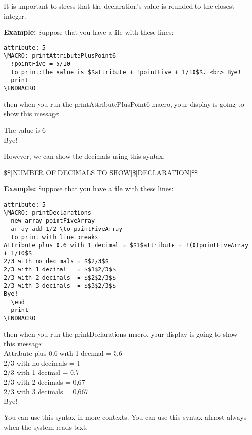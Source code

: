 \documentclass[11pt,a4paper,openright,oneside]{book}
\newenvironment{ex}
{
  \setlength{\parindent}{0cm}
  \large \textbf{Example:} \normalsize 
}
{}
\begin{document}
It is important to stress that the declaration's value is rounded to the closest integer.

\begin{ex} Suppose that you have a file with these lines:
  \begin{lstlisting}
attribute: 5
\MACRO: printAttributePlusPoint6
  !pointFive = 5/10
  to print:The value is $$attribute + !pointFive + 1/10$$. <br> Bye!
  print
\ENDMACRO
  \end{lstlisting} 
then when you run the \textsf{printAttributePlusPoint6} macro, your display is going to show this message:
\vspace{5px}

\textsf{The value is 6 \\
Bye! \\}
\end{ex}

However, we can show the decimals using this syntax:
\begin{center} \textsf{\$\$\textsc{\scriptsize[NUMBER OF DECIMALS TO SHOW]}\$\textsc{\scriptsize[DECLARATION]}\$\$} \end{center}

\begin{ex} Suppose that you have a file with these lines:
\scriptsize
  \begin{lstlisting}
attribute: 5
\MACRO: printDeclarations
  new array pointFiveArray
  array-add 1/2 \to pointFiveArray
  to print with line breaks
Attribute plus 0.6 with 1 decimal = $$1$attribute + !(0)pointFiveArray + 1/10$$
2/3 with no decimals = $$2/3$$
2/3 with 1 decimal   = $$1$2/3$$
2/3 with 2 decimals  = $$2$2/3$$
2/3 with 3 decimals  = $$3$2/3$$
Bye!
  \end
  print
\ENDMACRO
  \end{lstlisting} 
\normalsize
then when you run the \textsf{printDeclarations} macro, your display is going to show this message: \vspace{5px} \\
\textsf{Attribute plus 0.6 with 1 decimal = 5,6 \\ 
2/3 with no decimals = 1 \\
2/3 with 1 decimal = 0,7 \\
2/3 with 2 decimals = 0,67 \\
2/3 with 3 decimals = 0,667 \\
Bye! \\}
\end{ex}

You can use this syntax in more contexts. You can use this syntax almost always when the system reads text.
\end{document}

